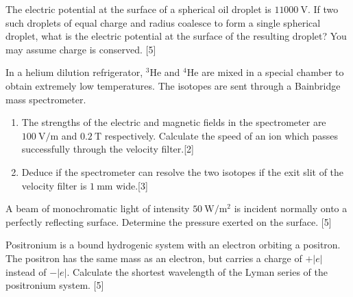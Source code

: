 \begin{problem}
    \begin{subproblem}
        The electric potential at the surface of a spherical oil droplet is $1\qty{1000}{\V}$. If two such droplets of equal charge and radius coalesce to form a single spherical droplet, what is the electric potential at the surface of the resulting droplet? You may assume charge is conserved.
    \hfill{[5]}\end{subproblem}
    \begin{subproblem}
        In a helium dilution refrigerator, ${}^{3}\mathrm{He}$ and ${}^{4}\mathrm{He}$ are mixed in a special chamber to obtain extremely low temperatures. The isotopes are sent through a Bainbridge mass spectrometer.
        \renewcommand{\theenumi}{(\alph{enumi})}
        \begin{enumerate}
            \item The strengths of the electric and magnetic fields in the spectrometer are $\qty{100}{\V\per\m}$ and $\qty{0.2}{\tesla}$ respectively. Calculate the speed of an ion which passes successfully through the velocity filter.\hfill{[2]}
            \item Deduce if the spectrometer can resolve the two isotopes if the exit slit of the velocity filter is $\qty{1}{\mm}$ wide.\hfill{[3]}
        \end{enumerate}
    \end{subproblem}
\end{problem}

\begin{problem}
    \begin{subproblem}
        A beam of monochromatic light of intensity $\qty{50}{\W\per\square\m}$ is incident normally onto a perfectly reflecting surface. Determine the pressure exerted on the surface.
    \hfill{[5]}\end{subproblem}
    \begin{subproblem}
        Positronium is a bound hydrogenic system with an electron orbiting a positron. The positron has the same mass as an electron, but carries a charge of $+|e|$ instead of $-|e| .$ Calculate the shortest wavelength of the Lyman series of the positronium system.
    \hfill{[5]}\end{subproblem}
\end{problem}

